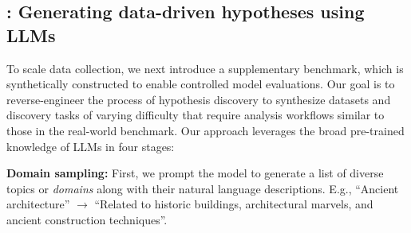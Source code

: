 \subsection{\synth: Generating data-driven hypotheses using LLMs}
To scale data collection, we next introduce a supplementary benchmark,
which is synthetically constructed to enable controlled model evaluations. 
Our goal is to reverse-engineer the process of hypothesis discovery to synthesize datasets and discovery tasks of varying difficulty that require analysis workflows similar to those in the real-world benchmark. 
Our approach leverages the broad pre-trained knowledge of LLMs in four stages:

\textbf{Domain sampling:} First, we prompt the model to generate a list of diverse topics or \emph{domains} along with their natural language descriptions. E.g., 
``Ancient architecture'' $\rightarrow$ ``Related to historic buildings, architectural marvels, and ancient construction techniques''.

